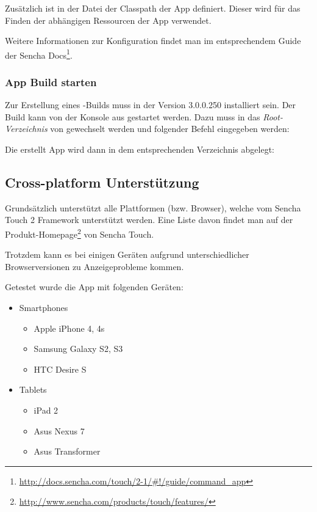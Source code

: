 Zusätzlich ist in der Datei  der Classpath der App definiert.
Dieser wird für das Finden der abhängigen Ressourcen der App verwendet.

Weitere Informationen zur Konfiguration findet man im entsprechendem Guide der Sencha Docs\footnote{\url{http://docs.sencha.com/touch/2-1/\#!/guide/command\_app}}.

\subsubsection{App Build starten}
Zur Erstellung eines \kort{}-Builds muss  in der Version 3.0.0.250 installiert sein.
Der Build kann von der Konsole aus gestartet werden. Dazu muss in das \emph{Root-Verzeichnis} von \kort{} gewechselt werden und folgender Befehl eingegeben werden:


Die erstellt App wird dann in dem entsprechenden Verzeichnis abgelegt:


\subsection{Cross-platform Unterstützung}
\label{cross-platform}
Grundsätzlich unterstützt \kort{} alle Plattformen (bzw. Browser), welche vom Sencha Touch 2 Framework unterstützt werden.
Eine Liste davon findet man auf der Produkt-Homepage\footnote{\url{http://www.sencha.com/products/touch/features/}} von Sencha Touch.

Trotzdem kann es bei einigen Geräten aufgrund unterschiedlicher Browserversionen zu Anzeigeprobleme kommen.

Getestet wurde die App mit folgenden Geräten:

\begin{itemize}
	\item Smartphones
	\begin{itemize}
		\item Apple iPhone 4, 4s
		\item Samsung Galaxy S2, S3
		\item HTC Desire S
	\end{itemize}
	\item Tablets
	\begin{itemize}
		\item iPad 2
		\item Asus Nexus 7
		\item Asus Transformer
	\end{itemize}
\end{itemize}

